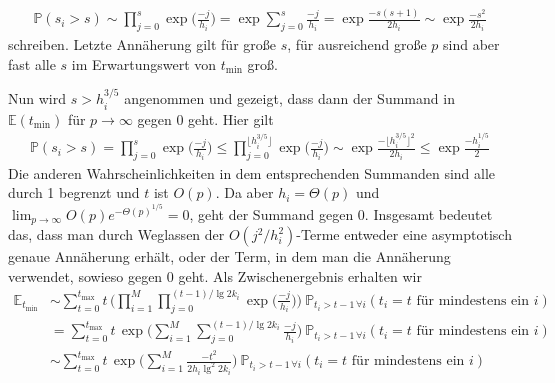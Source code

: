 \documentclass[a4paper, 10pt, ngerman]{article}
\newcommand{\E}{\mathbb{E}}
\renewcommand{\P}{\mathbb{P}}
\begin{document}
\begin{align*}
    \P(s_i > s)
    \sim \prod_{j = 0}^{s} \exp \bigg ( \frac {-j}{h_i} \bigg )
    =\exp \sum_{j = 0}^{s} \frac {-j} {h_i}
    = \exp \frac {-s (s + 1)} {2h_i}
    \sim \exp \frac {-s^2} {2h_i}
\end{align*}
schreiben. Letzte Annäherung gilt für große $s$, für ausreichend große $p$ sind aber fast alle $s$ im Erwartungswert von $t_{\min}$ groß.

Nun wird $s > h_i^{3/5}$ angenommen und gezeigt, dass dann der Summand in $\E(t_{\min})$ für $p \to \infty$ gegen 0 geht. Hier gilt
\begin{align*}
    \P(s_i > s)
    = \prod_{j = 0}^{s} \exp \bigg ( \frac {-j}{h_i} \bigg )
    \le \prod_{j = 0}^{\big \lfloor h_i^{3/5} \big \rfloor}
    \exp \bigg ( \frac {-j}{h_i} \bigg )
    \sim \exp \frac {- \big \lfloor h_i^{3/5} \big \rfloor^2 } {2h_i}
    \le \exp \frac {- h_i^{1/5}} {2}
\end{align*}
Die anderen Wahrscheinlichkeiten in dem entsprechenden Summanden sind alle durch 1 begrenzt und $t$ ist $O(p)$. Da aber $h_i = \Theta(p)$ und $\lim_{p \to \infty} O(p) e^{-\Theta(p)^{1/5}} = 0$, geht der Summand gegen 0. Insgesamt bedeutet das, dass man durch Weglassen der $O(j^2/h_i^2)$-Terme entweder eine asymptotisch genaue Annäherung erhält, oder der Term, in dem man die Annäherung verwendet, sowieso gegen 0 geht. Als Zwischenergebnis erhalten wir
\begin{align}
    \E_{t_{\min}}
     & \sim \sum_{t = 0}^{t_{\max}} t \,
    \Bigg ( \prod_{i = 1}^M \prod_{j = 0}^{(t-1) / \lg 2k_i}
    \exp \bigg ( \frac {-j}{h_i} \bigg ) \Bigg ) \
    \P_{t_i > t - 1 \, \forall i}(t_i = t \text{ für mindestens ein } i)
    \nonumber                            \\
     & = \sum_{t = 0}^{t_{\max}} t \,
    \exp \Bigg ( \sum_{i = 1}^M \sum_{j = 0}^{(t-1) / \lg 2k_i}
    \frac {-j}{h_i} \Bigg ) \
    \P_{t_i > t - 1 \, \forall i}(t_i = t \text{ für mindestens ein } i)
    \nonumber                            \\
     & \sim \sum_{t = 0}^{t_{\max}} t \,
    \exp \Bigg ( \sum_{i = 1}^M \frac {-t^2} {2 h_i \lg^2 2k_i} \Bigg ) \
    \P_{t_i > t - 1 \, \forall i}(t_i = t \text{ für mindestens ein } i)
    \label{expectation-tmin-intermed}
\end{align}
\end{document}
